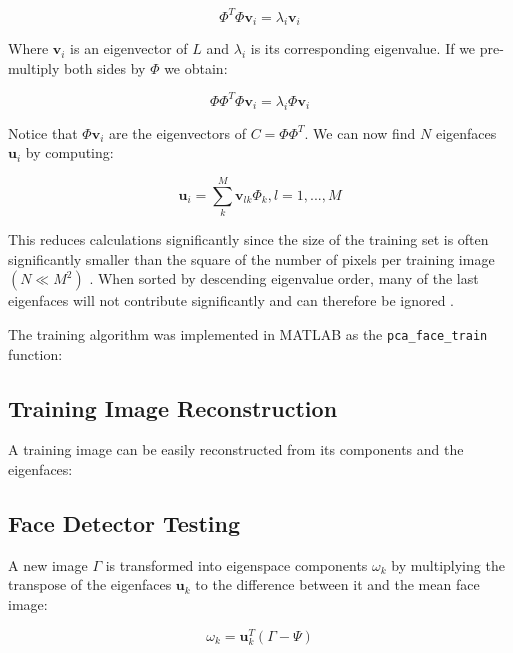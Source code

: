 \documentclass[10pt,letterpaper]{article}
\begin{document}
\begin{equation}
   \Phi^T \Phi  \mathbf{v}_i = \lambda_i \mathbf{v}_i
\end{equation}

Where $\mathbf{v}_i$ is an eigenvector of $L$ and $\lambda_i$ is its corresponding
eigenvalue. If we pre-multiply both sides by $\Phi$ we obtain:

\begin{equation}
    \Phi \Phi^T \Phi \mathbf{v}_i = \lambda_i \Phi \mathbf{v}_i
\end{equation}

Notice that $\Phi \mathbf{v}_i$ are the eigenvectors of $C = \Phi \Phi^T$.
We can now find $N$ eigenfaces $\mathbf{u}_i$ by computing:

\begin{equation}
    \mathbf{u}_i = \sum_k^M \mathbf{v}_{lk} \Phi_k, l = 1,...,M
\end{equation} 

This reduces calculations significantly since the size of the training set is 
often significantly smaller than the square of the number of pixels per training 
image $(N \ll M^2)$ \cite{turk_pentland_1991}. When sorted by descending 
eigenvalue order, many of the last eigenfaces will not contribute significantly 
and can therefore be ignored \cite{emami_2010}.

The training algorithm was implemented in MATLAB as the \verb|pca_face_train| function:

{\footnotesize
    
}

\subsection{Training Image Reconstruction}

A training image can be easily reconstructed from its components and the eigenfaces:

{\footnotesize
    
}

\subsection{Face Detector Testing}

A new image $\Gamma$ is transformed into eigenspace components $\omega_k$ by 
multiplying the transpose of the eigenfaces $\mathbf{u}_k$ to the difference between
it and the mean face image:

\begin{equation}
    \omega_k = \mathbf{u}_k^T (\Gamma - \Psi)
\end{equation}
\end{document}

